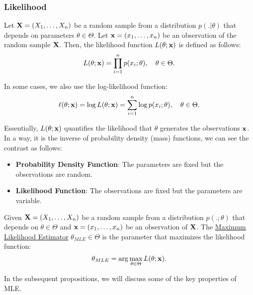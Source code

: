 \begin{proof*}
\subsubsection{Likelihood}
\begin{definition}
    Let ${\bf X}=(X_1, \dots, X_n)$ be a random sample from a distribution $p(.|\theta)$ that depends on parameters $\theta\in\Theta$. Let ${\bf x}=(x_1, \dots, x_n)$ be an observation of the random sample ${\bf X}$. Then, the likelihood function $L(\theta;{\bf x})$ is defined as follows:
    \begin{equation}
        L(\theta;{\bf x}) = \prod_{i=1}^n p(x_i;\theta), \quad \theta\in\Theta.
    \end{equation}

    \noindent In some cases, we also use the log-likelihood function:
    \begin{equation}
        \ell(\theta;{\bf x}) = \log L(\theta;{\bf x}) = \sum_{i=1}^n \log p(x_i;\theta), \quad \theta\in\Theta.
    \end{equation}

    \noindent Essentially, $L(\theta;{\bf x})$ quantifies the likelihood that $\theta$ generates the observations ${\bf x}$. In a way, it is the inverse of probability density (mass) functions, we can see the contrast as follows:
    \begin{itemize}
        \item \textbf{Probability Density Function}: The parameters are fixed but the observations are random.
        \item \textbf{Likelihood Function}: The observations are fixed but the parameters are variable.
    \end{itemize} 
\end{definition}

\begin{definition}
    Given ${\bf X}=(X_1, \dots, X_n)$ be a random sample from a distribution $p(.;\theta)$ that depends on $\theta\in\Theta$ and ${\bf x}=(x_1, \dots, x_n)$ be an observation of ${\bf X}$. The \underline{Maximum Likelihood Estimator} $\theta_{MLE}\in\Theta$ is the parameter that maximizes the likelihood function:
    \begin{equation}
        \theta_{MLE} = \arg\max_{\theta\in\Theta} L(\theta;{\bf x}).
    \end{equation}

    \noindent In the subsequent propositions, we will discuss some of the key properties of MLE.
\end{definition} 



\end{proof*}
